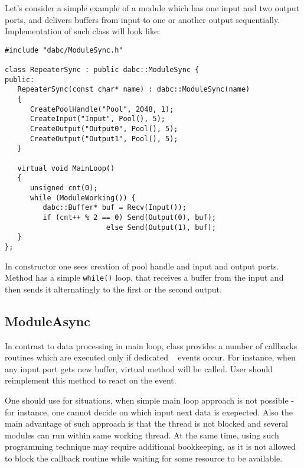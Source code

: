 Let's consider a simple example of a  module 
which has one input and two output ports, and delivers buffers from input to
one or another output sequentially. Implementation of such 
class will look like:
\begin{small}
\begin{verbatim}
#include "dabc/ModuleSync.h"

class RepeaterSync : public dabc::ModuleSync {
public:
   RepeaterSync(const char* name) : dabc::ModuleSync(name)
   {
      CreatePoolHandle("Pool", 2048, 1);
      CreateInput("Input", Pool(), 5);
      CreateOutput("Output0", Pool(), 5);
      CreateOutput("Output1", Pool(), 5);
   }
     
   virtual void MainLoop()
   {
      unsigned cnt(0);
      while (ModuleWorking()) {
         dabc::Buffer* buf = Recv(Input());
         if (cnt++ % 2 == 0) Send(Output(0), buf);
                        else Send(Output(1), buf);
   }
};
\end{verbatim}
\end{small}

In constructor one sees creation of pool handle and input and output ports.
Method  has a simple {\tt while()} loop, 
that receives a buffer from the
input and then sends it alternatingly to the first or the second output.

  
\subsection{ModuleAsync}
\label{plugin_module_async}

In contrast to data processing in  main loop,
class  provides a
number of callbacks routines which are executed only if dedicated \dabc~ events occur.
For instance, when any input port gets new buffer, virtual method 
 will
be called. User should reimplement this method to react on the event.

One should use  for situations, when simple main loop approach
is not possible - for instance, one cannot decide on which input next data is exepected.  
Also the main advantage of such approach is that the thread is not blocked and
several  modules can run within same working thread.
At the same time, using such programming technique may require additional 
bookkeeping, as it is not allowed to block the callback routine while waiting for
some resource to be available.

